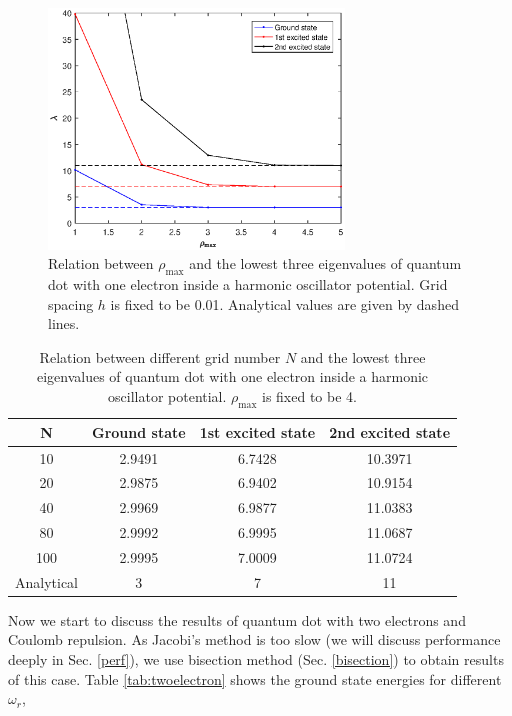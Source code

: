 \documentclass{article}
\begin{document}
\begin{figure}[tb]
\label{fig:rmax_lambda}
\centering
\includegraphics[width=0.7\textwidth]{lambda_rmax.eps}
\caption{Relation between $\rho_{\max}$ and the lowest three eigenvalues of quantum dot with one electron inside a harmonic oscillator potential. Grid spacing $h$ is fixed to be 0.01. Analytical values are given by dashed lines. }
\end{figure}
\begin{table}[tb]
	\centering
	\caption{Relation between different grid number $N$ and the lowest three eigenvalues of quantum dot with one electron inside a harmonic oscillator potential. $\rho_{\max}$ is fixed to be 4. }
	\label{tab:diffN}
	\begin{tabular}{cccc}
		\hline
		\hline
		N   & Ground state & 1st excited state & 2nd excited state \\
		\hline
		10  & 2.9491 & 6.7428 & 10.3971 \\
		20  & 2.9875 & 6.9402 & 10.9154 \\
		40  & 2.9969 & 6.9877 & 11.0383 \\
		80  & 2.9992 & 6.9995 & 11.0687 \\
		100 & 2.9995 & 7.0009 & 11.0724 \\
		Analytical & 3 & 7 & 11 \\
		\hline
		\hline
	\end{tabular}
\end{table}
\par
Now we start to discuss the results of quantum dot with two electrons and Coulomb repulsion. 
As Jacobi's method is too slow (we will discuss performance deeply in Sec. \ref{perf}), 
we use bisection method (Sec. \ref{bisection}) to obtain results of this case. 
Table \ref{tab:twoelectron} shows the ground state energies for different $\omega_r$, 
\end{document}
